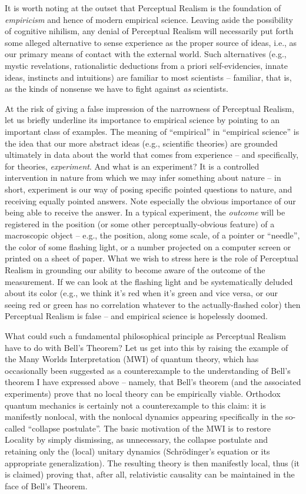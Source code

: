 \documentclass[12pt]{article}
\begin{document}
It is worth noting at the outset that Perceptual Realism is the
foundation of \emph{empiricism} and hence of modern empirical
science.  Leaving aside the possibility of cognitive nihilism, any
denial of Perceptual Realism will necessarily put forth some alleged
alternative to sense experience as the proper source of ideas, i.e.,
as our primary means of contact with the external world.  Such
alternatives (e.g., mystic revelations, rationalistic deductions from
a priori self-evidencies, innate ideas, instincts and intuitions)
are familiar to most scientists -- familiar, that is, as the kinds of
nonsense we have to fight against \emph{as} scientists.  

At the risk
of giving a false impression of the narrowness of Perceptual Realism,
let us briefly underline its importance to empirical science by
pointing to an important class of examples.  The meaning of
``empirical'' in ``empirical science'' is the idea that our more
abstract ideas (e.g., scientific theories) are grounded ultimately in
data about the world that comes from experience -- and specifically,
for theories, \emph{experiment}.  And what is
an experiment?  It is a controlled intervention in nature from which
we may infer something about nature -- in short, experiment is our 
way of posing specific pointed questions to nature, and receiving
equally pointed answers.  Note especially the obvious importance of
our being able to receive the answer.  In a typical experiment, the
\emph{outcome} will be registered in the position (or some other
perceptually-obvious feature) of a macroscopic object -- e.g., the
position, along some scale, of a pointer or ``needle'', the color of
some flashing light, or a number projected on a computer screen or
printed on a sheet of paper.  What we wish to stress here is the role
of Perceptual Realism in grounding our ability to become aware of the
outcome of the measurement.  If we can look at the flashing light and
be systematically deluded about its color (e.g., we think it's red
when it's green and vice versa, or our seeing red or green has no
correlation whatever to the actually-flashed color) then Perceptual
Realism is false -- and empirical science is hopelessly doomed.  

What could such a fundamental philosophical principle as Perceptual
Realism have to do with Bell's Theorem?  Let us get into this by
raising the example of the Many Worlds Interpretation (MWI) of quantum
theory, which has occasionally been suggested as a counterexample to
the understanding of Bell's theorem I have expressed above -- namely,
that Bell's theorem (and the associated experiments) prove that no 
local theory can be empirically viable.  Orthodox quantum mechanics 
is certainly not a
counterexample to this claim: it is manifestly nonlocal, with the
nonlocal dynamics appearing specifically in the so-called ``collapse
postulate''.  The basic motivation of the MWI is to restore Locality
by simply dismissing, as unnecessary, the collapse postulate and
retaining only the (local) unitary dynamics (Schr\"odinger's equation 
or its appropriate generalization).  The resulting theory is then
manifestly local, thus (it is claimed) proving that, after all,
relativistic causality can be maintained in the face of Bell's
Theorem. 
\end{document}
